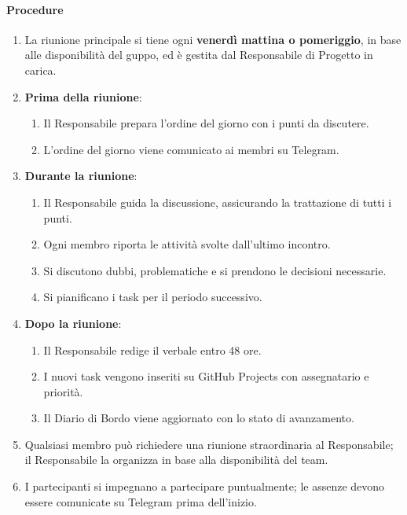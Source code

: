 \documentclass[a4paper, 11pt, oneside]{scrartcl}
\begin{document}
\paragraph{Procedure}
\begin{enumerate}
    \item La riunione principale si tiene ogni \textbf{venerdì mattina o pomeriggio}, in base alle disponibilità del guppo, ed è gestita dal Responsabile di Progetto in carica.
    \item \textbf{Prima della riunione}:
    \begin{enumerate}[label=\alph*.]
        \item Il Responsabile prepara l'ordine del giorno con i punti da discutere.
        \item L'ordine del giorno viene comunicato ai membri su Telegram.
    \end{enumerate}
    \item \textbf{Durante la riunione}:
    \begin{enumerate}[label=\alph*.]
        \item Il Responsabile guida la discussione, assicurando la trattazione di tutti i punti.
        \item Ogni membro riporta le attività svolte dall'ultimo incontro.
        \item Si discutono dubbi, problematiche e si prendono le decisioni necessarie.
        \item Si pianificano i task per il periodo successivo.
    \end{enumerate}
    \item \textbf{Dopo la riunione}:
    \begin{enumerate}[label=\alph*.]
        \item Il Responsabile redige il verbale entro 48 ore.
        \item I nuovi task vengono inseriti su GitHub Projects con assegnatario e priorità.
        \item Il Diario di Bordo viene aggiornato con lo stato di avanzamento.
    \end{enumerate}
    \item Qualsiasi membro può richiedere una riunione straordinaria al Responsabile; il Responsabile la organizza in base alla disponibilità del team.
    \item I partecipanti si impegnano a partecipare puntualmente; le assenze devono essere comunicate su Telegram prima dell'inizio.
\end{enumerate}
\end{document}
